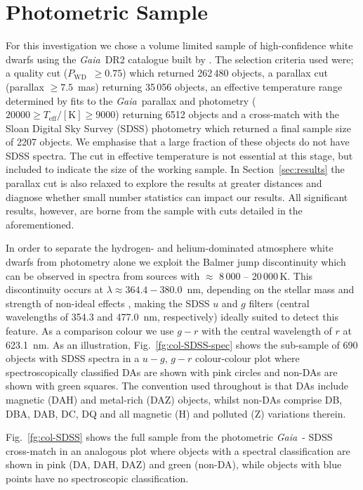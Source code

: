 \documentclass[a4paper,fleqn,usenatbib]{mnras}
\newcommand{\Pwd}{$P_{\mathrm{WD}}$}
\newcommand{\gaia}{{\it Gaia}}
\begin{document}
\section{Photometric Sample}
\label{sec:sample}
For this investigation we chose a volume limited sample of high-confidence white dwarfs using the \gaia\ DR2 catalogue built by \citet{ngf19}. The selection criteria used were; a quality cut (\Pwd\ $\geq0.75$) which returned 262\,480 objects, a parallax cut (parallax $\geq 7.5$~mas) returning 35\,056 objects, an effective temperature range determined by fits to the \gaia\ parallax and photometry ($20000 \geq T_{\mathrm{eff}}/\mathrm{[K]} \geq 9000$) returning 6512 objects and a cross-match with the Sloan Digital Sky Survey (SDSS) photometry which returned a final sample size of 2207 objects. We emphasise that a large fraction of these objects do not have SDSS spectra. The cut in effective temperature is not essential at this stage, but included to indicate the size of the working sample. In Section~\ref{sec:results} the parallax cut is also relaxed to explore the results at greater distances and diagnose whether small number statistics can impact our results. All significant results, however, are borne from the sample with cuts detailed in the aforementioned.  

In order to separate the hydrogen- and helium-dominated atmosphere white dwarfs from photometry alone we exploit the Balmer jump discontinuity which can be observed in spectra from sources with \teff$\approx$ 8\,000 -- 20\,000\,K. This discontinuity occurs at $\lambda \approx 364.4 - 380.0$~nm, depending on the stellar mass and strength of non-ideal effects \citep{hummer88}, making the SDSS $u$ and $g$ filters (central wavelengths of 354.3 and 477.0~nm, respectively) ideally suited to detect this feature. As a comparison colour we use $g-r$ with the central wavelength of $r$ at 623.1~nm. As an illustration, Fig.~\ref{fg:col-SDSS-spec} shows the sub-sample of 690 objects with SDSS spectra in a $u-g$, $g-r$ colour-colour plot where spectroscopically classified DAs are shown with pink circles and non-DAs are shown with green squares. The convention used throughout is that DAs include magnetic (DAH) and metal-rich (DAZ) objects, whilst non-DAs comprise DB, DBA, DAB, DC, DQ and all magnetic (H) and polluted (Z) variations therein.

Fig.~\ref{fg:col-SDSS} shows the full sample from the photometric \gaia\ - SDSS cross-match in an analogous plot where objects with a spectral classification are shown in pink (DA, DAH, DAZ) and green (non-DA), while objects with blue points have no spectroscopic classification. 
\end{document}
